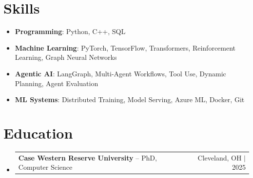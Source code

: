 \documentclass[letterpaper,13pt]{article}
\makeatletter
\newcommand{\resumeProjectHeading}[2]{
    \item
    \begin{tabular*}{\textwidth}{l@{\extracolsep{\fill}}r}
      \small#1 & #2 \\
    \end{tabular*}\vspace{-4pt}
}
\newcommand{\resumeSubHeadingListStart}{\begin{itemize}[leftmargin=0in, label={}]}
\newcommand{\resumeSubHeadingListEnd}{\end{itemize}}
\makeatother
\begin{document}
\section{Skills}
\vspace{0.02cm}
\begin{itemize}[leftmargin=0.15in, label={}, itemsep=2pt, topsep=1pt]
  \item \textbf{Programming}: Python, C++, SQL
  \item \textbf{Machine Learning}: PyTorch, TensorFlow, Transformers, Reinforcement Learning, Graph Neural Networks
  \item \textbf{Agentic AI}: LangGraph, Multi-Agent Workflows, Tool Use, Dynamic Planning, Agent Evaluation
  \item \textbf{ML Systems}: Distributed Training, Model Serving, Azure ML, Docker, Git
\end{itemize}
\vspace{0.02cm}

\section{Education}
\resumeSubHeadingListStart
  \resumeProjectHeading{\textbf{Case Western Reserve University} -- PhD, Computer Science}{Cleveland, OH $|$ 2025}
\resumeSubHeadingListEnd
\end{document}
